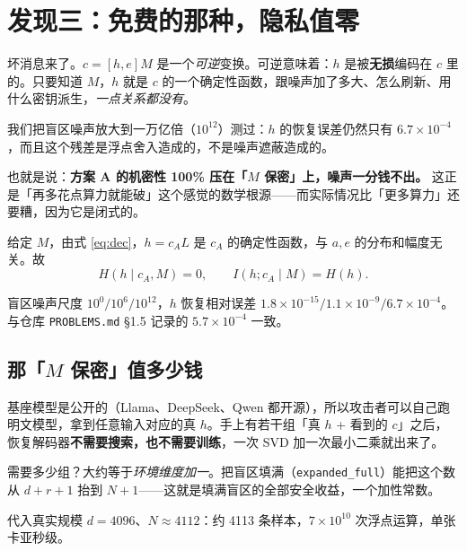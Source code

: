 \documentclass[UTF8, fontset=macnew, 11pt]{ctexart}
\begin{document}
\section{发现三：免费的那种，隐私值零}

\begin{plainbox}
坏消息来了。$c=[h,e]M$ 是一个\emph{可逆}变换。可逆意味着：$h$ 是被\textbf{无损}编码在 $c$ 里的。只要知道 $M$，$h$ 就是 $c$ 的一个确定性函数，跟噪声加了多大、怎么刷新、用什么密钥派生，\emph{一点关系都没有}。

我们把盲区噪声放大到一万亿倍（$10^{12}$）测过：$h$ 的恢复误差仍然只有 $6.7\times10^{-4}$，而且这个残差是浮点舍入造成的，不是噪声遮蔽造成的。

也就是说：\textbf{方案 A 的机密性 100\% 压在「$M$ 保密」上，噪声一分钱不出。} 这正是「再多花点算力就能破」这个感觉的数学根源——而实际情况比「更多算力」还要糟，因为它是闭式的。
\end{plainbox}

\begin{mathbox}[定理 4：零条件熵]
给定 $M$，由式 \eqref{eq:dec}，$h=c_AL$ 是 $c_A$ 的确定性函数，与 $a,e$ 的分布和幅度无关。故
$$H(h\mid c_A,M)=0,\qquad I(h;c_A\mid M)=H(h).$$
\end{mathbox}

\begin{numbox}
盲区噪声尺度 $10^0/10^6/10^{12}$，$h$ 恢复相对误差 $1.8\times10^{-15}/1.1\times10^{-9}/6.7\times10^{-4}$。与仓库 \texttt{PROBLEMS.md} §1.5 记录的 $5.7\times10^{-4}$ 一致。
\end{numbox}

\subsection{那「$M$ 保密」值多少钱}

\begin{plainbox}
基座模型是公开的（Llama、DeepSeek、Qwen 都开源），所以攻击者可以自己跑明文模型，拿到任意输入对应的真 $h$。手上有若干组「真 $h$ + 看到的 $c$」之后，恢复解码器\textbf{不需要搜索，也不需要训练}，一次 SVD 加一次最小二乘就出来了。

需要多少组？大约等于\emph{环境维度加一}。把盲区填满（\texttt{expanded\_full}）能把这个数从 $d+r+1$ 抬到 $N+1$——这就是填满盲区的全部安全收益，一个加性常数。

代入真实规模 $d=4096$、$N\approx4112$：约 4113 条样本，$7\times10^{10}$ 次浮点运算，单张卡亚秒级。
\end{plainbox}
\end{document}
